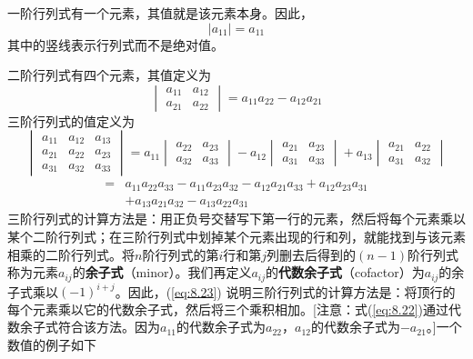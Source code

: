     一阶行列式有一个元素，其值就是该元素本身。因此，
    \begin{equation}
        \left| a_{11} \right| = a_{11}
        \label{eq:8.21}
    \end{equation}
    其中的竖线表示行列式而不是绝对值。

    二阶行列式有四个元素，其值定义为
    \begin{equation}
        \boxed{
            \begin{vmatrix}
                a_{11} & a_{12} \\
                a_{21} & a_{22}
            \end{vmatrix} = a_{11}a_{22} - a_{12}a_{21}
        }
        \label{eq:8.22}
    \end{equation}
    三阶行列式的值定义为
    \begin{equation}
            \boxed{
            \begin{vmatrix}
                a_{11} & a_{12} & a_{13} \\
                a_{21} & a_{22} & a_{23} \\
                a_{31} & a_{32} & a_{33}
            \end{vmatrix} = a_{11}\begin{vmatrix}
                a_{22} & a_{23} \\
                a_{32} & a_{33}
            \end{vmatrix} - a_{12}\begin{vmatrix}
                a_{21} & a_{23} \\
                a_{31} & a_{33}
            \end{vmatrix} + a_{13}\begin{vmatrix}
                a_{21} & a_{22} \\
                a_{31} & a_{32}
            \end{vmatrix}
        }
        \label{eq:8.23}
    \end{equation}
    \begin{equation}
        \begin{aligned}
            = & a_{11}a_{22}a_{33} - a_{11}a_{23}a_{32} - a_{12}a_{21}a_{33} + a_{12}a_{23}a_{31} \\ 
            & + a_{13}a_{21}a_{32} - a_{13}a_{22}a_{31}
        \end{aligned}
        \label{eq:8.24}
    \end{equation}
    三阶行列式的计算方法是：用正负号交替写下第一行的元素，然后将每个元素乘以某个二阶行列式；在三阶行列式中划掉某个元素出现的行和列，就能找到与该元素相乘的二阶行列式。将$n$阶行列式的第$i$行和第$j$列删去后得到的$\left(n-1\right)$阶行列式称为元素$a_{ij}$的\textbf{余子式}（minor）。我们再定义$a_{ij}$的\textbf{代数余子式}（cofactor）为$a_{ij}$的余子式乘以$(-1)^{i+j}$。因此，(\ref{eq:8.23}) 说明三阶行列式的计算方法是：将顶行的每个元素乘以它的代数余子式，然后将三个乘积相加。[注意：式(\ref{eq:8.22})通过代数余子式符合该方法。因为$a_{11}$的代数余子式为$a_{22}$，$a_{12}$的代数余子式为$-a_{21}$。]一个数值的例子如下
